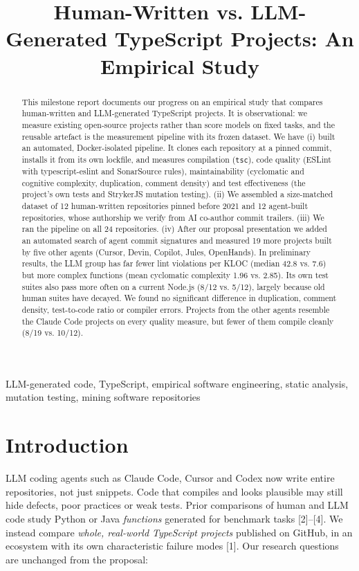 \documentclass[10pt,conference]{IEEEtran}
\begin{document}
\title{Human-Written vs. LLM-Generated TypeScript Projects: An Empirical Study}
\author{}
\maketitle

\begin{abstract}
This milestone report documents our progress on an empirical study that compares human-written and LLM-generated TypeScript projects. It is observational: we measure existing open-source projects rather than score models on fixed tasks, and the reusable artefact is the measurement pipeline with its frozen dataset. We have (i) built an automated, Docker-isolated pipeline. It clones each repository at a pinned commit, installs it from its own lockfile, and measures compilation (\texttt{tsc}), code quality (ESLint with typescript-eslint and SonarSource rules), maintainability (cyclomatic and cognitive complexity, duplication, comment density) and test effectiveness (the project's own tests and StrykerJS mutation testing). (ii) We assembled a size-matched dataset of 12 human-written repositories pinned before 2021 and 12 agent-built repositories, whose authorship we verify from AI co-author commit trailers. (iii) We ran the pipeline on all 24 repositories. (iv) After our proposal presentation we added an automated search of agent commit signatures and measured 19 more projects built by five other agents (Cursor, Devin, Copilot, Jules, OpenHands). In preliminary results, the LLM group has far fewer lint violations per KLOC (median 42.8 vs. 7.6) but more complex functions (mean cyclomatic complexity 1.96 vs. 2.85). Its own test suites also pass more often on a current Node.js (8/12 vs. 5/12), largely because old human suites have decayed. We found no significant difference in duplication, comment density, test-to-code ratio or compiler errors. Projects from the other agents resemble the Claude Code projects on every quality measure, but fewer of them compile cleanly (8/19 vs. 10/12).
\end{abstract}
\begin{IEEEkeywords}
LLM-generated code, TypeScript, empirical software engineering, static analysis, mutation testing, mining software repositories
\end{IEEEkeywords}

\section{Introduction}
LLM coding agents such as Claude Code, Cursor and Codex now write entire repositories, not just snippets. Code that compiles and looks plausible may still hide defects, poor practices or weak tests. Prior comparisons of human and LLM code study Python or Java \emph{functions} generated for benchmark tasks [2]--[4]. We instead compare \emph{whole, real-world TypeScript projects} published on GitHub, in an ecosystem with its own characteristic failure modes [1]. Our research questions are unchanged from the proposal:
\end{document}
